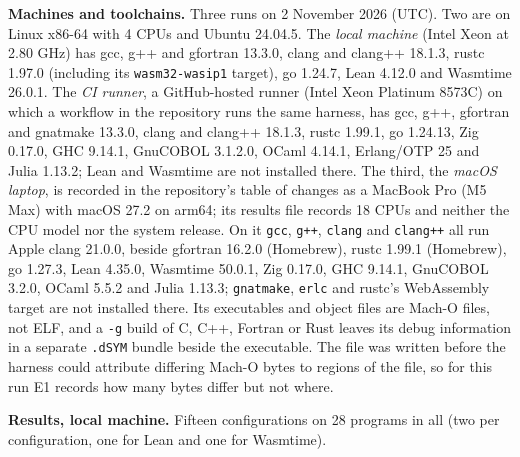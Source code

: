 \documentclass[10pt,letterpaper]{article}
\begin{document}
\textbf{Machines and toolchains.} Three runs on 2 November 2026 (UTC).
Two are on Linux x86-64 with 4 CPUs and Ubuntu 24.04.5. The \emph{local
machine} (Intel Xeon at 2.80 GHz) has gcc, g++ and gfortran 13.3.0,
clang and clang++ 18.1.3, rustc 1.97.0 (including its
\texttt{wasm32-\allowbreak{}wasip1} target), go 1.24.7, Lean 4.12.0 and Wasmtime
26.0.1. The \emph{CI runner}, a GitHub-hosted runner (Intel Xeon
Platinum 8573C) on which a workflow in the repository runs the same
harness, has gcc, g++, gfortran and gnatmake 13.3.0, clang and clang++
18.1.3, rustc 1.99.1, go 1.24.13, Zig 0.17.0, GHC 9.14.1, GnuCOBOL
3.1.2.0, OCaml 4.14.1, Erlang/OTP 25 and Julia 1.13.2; Lean and Wasmtime
are not installed there. The third, the \emph{macOS laptop}, is recorded
in the repository's table of changes as a MacBook Pro (M5 Max) with
macOS 27.2 on arm64; its results file records 18 CPUs and neither the
CPU model nor the system release. On it \texttt{gcc}, \texttt{g++},
\texttt{clang} and \texttt{clang++} all run Apple clang 21.0.0, beside
gfortran 16.2.0 (Homebrew), rustc 1.99.1 (Homebrew), go 1.27.3, Lean
4.35.0, Wasmtime 50.0.1, Zig 0.17.0, GHC 9.14.1, GnuCOBOL 3.2.0, OCaml
5.5.2 and Julia 1.13.3; \texttt{gnatmake}, \texttt{erlc} and rustc's
WebAssembly target are not installed there. Its executables and object
files are Mach-O files, not ELF, and a \texttt{-g} build of C, C++,
Fortran or Rust leaves its debug information in a separate
\texttt{.dSYM} bundle beside the executable. The file was written before
the harness could attribute differing Mach-O bytes to regions of the
file, so for this run E1 records how many bytes differ but not where.

\textbf{Results, local machine.} Fifteen configurations on 28 programs
in all (two per configuration, one for Lean and one for Wasmtime).
\end{document}
